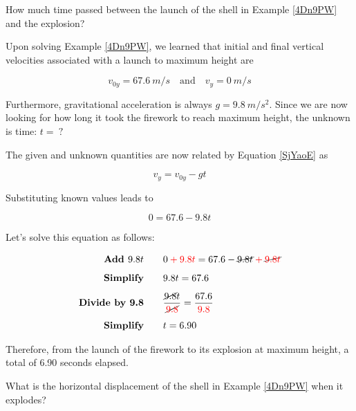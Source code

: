 \documentclass[main-physics.tex]{subfiles}
\begin{document}
\begin{example} \label{t57osh}
    How much time passed between the launch of the shell in Example \ref{4Dn9PW} and the explosion?
\end{example}

\Solution
Upon solving Example \ref{4Dn9PW}, we learned that initial and final vertical velocities associated with a launch to maximum height are

\begin{equation*}
    v_{0y} = \SI{67.6}{m/s} \quad \text{and} \quad v_y = \SI{0}{m/s}
\end{equation*}

Furthermore, gravitational acceleration is always $g = \SI{9.8}{m/s^2}$. Since we are now looking for how long it took the firework to reach maximum height, the unknown is time: $t =\ ?$

\vspace{1em}

The given and unknown quantities are now related by Equation \eqref{SjYaoE} as 

\begin{equation*}
    v_y = v_{0y} - gt
\end{equation*}

Substituting known values leads to

\begin{equation*}
    0 = 67.6 - 9.8 t
\end{equation*}

Let's solve this equation as follows:

\begin{align*}
    \textbf{Add $9.8 t$} \qquad & 0 \mathbin{\color{red} +} \textcolor{red}{9.8 t} = 67.6 - \cancel{9.8 t} \mathbin{\color{red} +} \cancel{\textcolor{red}{9.8 t}}\\[1ex]
    \textbf{Simplify} \qquad & 9.8 t = 67.6\\[1ex]
    \textbf{Divide by 9.8} \qquad & \frac{\cancel{9.8} t}{\cancel{\textcolor{red}{9.8}}} = \frac{67.6}{\textcolor{red}{9.8}}\\[1ex]
    \textbf{Simplify} \qquad & t = 6.90
\end{align*}

Therefore, from the launch of the firework to its explosion at maximum height, a total of 6.90 seconds elapsed.

\endsolution

\begin{example} 
    What is the horizontal displacement of the shell in Example \ref{4Dn9PW} when it explodes?
\end{example}
\end{document}
